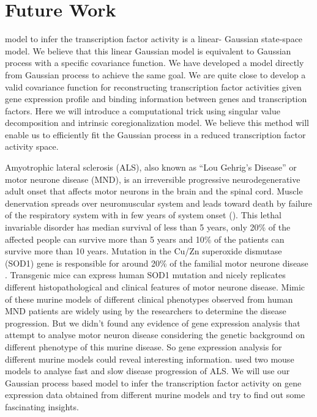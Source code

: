 \section{Future Work}
\cite{Sanguinetti:2006} model to infer the transcription factor 
activity is a linear- Gaussian state-space model. We believe that this linear Gaussian
model is equivalent to Gaussian process with a specific covariance function.
We have developed a model directly from Gaussian process to achieve the same goal.
We are quite close to develop a valid covariance function for reconstructing transcription
factor activities given gene expression profile and binding information between genes and
transcription factors. Here we will introduce a computational trick using
singular value decomposition and intrinsic coregionalization model. We believe
this method will enable us to efficiently fit the Gaussian process in a
reduced transcription factor activity space.

Amyotrophic lateral sclerosis (ALS), also known as ``Lou Gehrig's Disease'' or motor neurone disease 
(MND), is an irreversible progressive neurodegenerative adult onset that affects motor neurons 
in the brain and the spinal cord. Muscle denervation spreads over neuromuscular system and 
leads toward death by failure of the respiratory system with in few years of system 
onset (\cite{Peviani:2010}). 
This lethal invariable disorder has median survival of less than 5 years, only 20\% 
of the affected people can survive more than 5 years and 10\% of the patients 
can survive more than 10 years. Mutation in the Cu/Zn superoxide dismutase (SOD1) gene 
is responsible for around 20\% of the familial motor neurone disease \cite{Nardo:2013}. 
Transgenic mice can express human SOD1 mutation and nicely replicates different 
histopathological and clinical features of motor neurone disease. Mimic of these murine models 
of different clinical phenotypes observed from human MND patients are widely using by the 
researchers to determine the disease progression. But we didn't found any evidence of gene expression 
analysis that attempt to analyse motor neuron disease considering the genetic background on 
different phenotype of this murine disease. So gene expression analysis for different murine models 
could reveal interesting information. 
\cite{Nardo:2013} used two mouse models to analyse fast and slow disease progression of ALS.
We will use our Gaussian process based model to infer the 
transcription factor activity on gene expression data obtained from different murine models and 
try to find out some fascinating insights.

